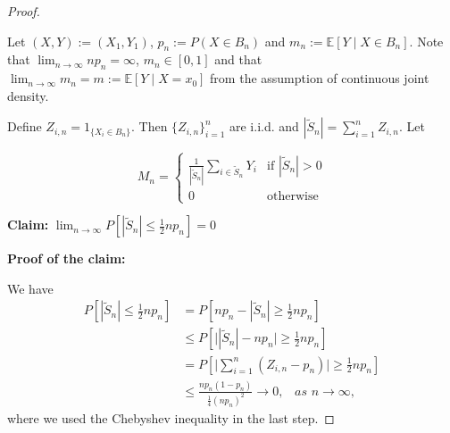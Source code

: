 \documentclass[a4paper,11pt]{article}
\begin{document}
\begin{proof}
\label{proof_of_thm2v2}

Let $(X, Y) := (X_1, Y_1)$, $p_n:=P(X\in B_n)$ and $m_n:=\mathbb{E}[Y\mid X\in B_n]$. Note that $\lim_{n\to\infty}np_n=\infty$,  $m_n \in [0,1]$ and that $\lim_{n\to\infty}m_n = m:=\mathbb{E}[Y\mid X=x_0]$ from the assumption of continuous joint density. 

Define $Z_{i,n} = 1_{\{X_i\in B_n\}}$. Then $\{Z_{i,n}\}_{i=1}^n$ are i.i.d. and $|\tilde{S}_n|=\sum_{i=1}^n Z_{i,n}$. Let

\[
M_n =
\begin{cases}
\frac{1}{|\tilde{S}_n|}\sum_{i\in \tilde{S}_n}Y_i & \text{if } |\tilde{S}_n| > 0 \\
0 & \text{otherwise}
\end{cases}
\]

\textbf{Claim:} $\lim_{n\to\infty}  P[|\tilde{S}_n|\leq \frac{1}{2}np_n]=0$

\textbf{Proof of the claim: } 

We have
\begin{align*}
P[|\tilde{S}_n|\leq \frac{1}{2}np_n] & = P[np_n - |\tilde{S}_n|\geq \frac{1}{2}np_n] \\&
\leq P[\big||\tilde{S}_n|-np_n\big| \geq \frac{1}{2}np_n]\\&
=P\left[\big|\sum_{i=1}^n(Z_{i,n}-p_n)\big|\geq \frac{1}{2}np_n\right]\\
&\overset{}{\leq} \frac{np_n(1-p_n)}{\frac{1}{4}(np_n)^2}\to 0 ,\,\,\,\,\,as\,\,n\to\infty,
\end{align*}
where we used the Chebyshev inequality in the last step. 


\end{proof}
\end{document}

